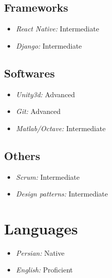 \documentclass{article}
\begin{document}
\subsection{Frameworks}
\begin{itemize}
        \item \emph{React Native:} Intermediate
        \item \emph{Django:} Intermediate
\end{itemize}

\subsection{Softwares}
\begin{itemize}
        \item \emph{Unity3d:} Advanced
        \item \emph{Git:} Advanced
        \item \emph{Matlab/Octave:} Intermediate
\end{itemize}

\subsection{Others}
\begin{itemize}
        \item \emph{Scrum:} Intermediate
        \item \emph{Design patterns:} Intermediate
\end{itemize}

\section{Languages}
\begin{itemize}
        \item \emph{Persian:} Native
        \item \emph{English:} Proficient
\end{itemize}
\end{document}
